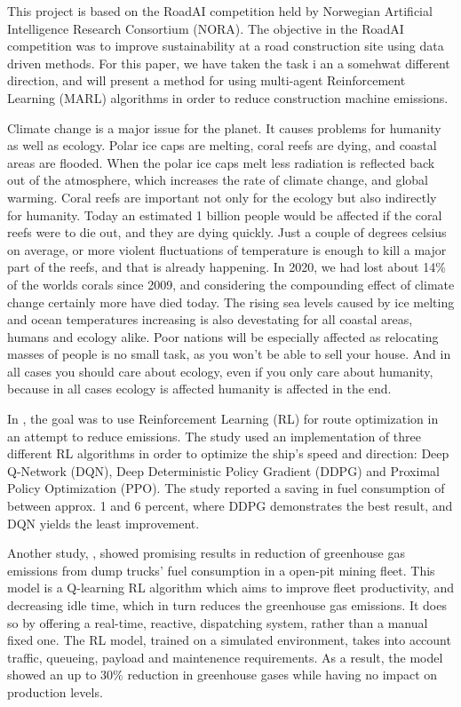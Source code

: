 \documentclass[conference]{IEEEtran}
\begin{document}
	This project is based on the RoadAI competition held by Norwegian Artificial Intelligence Research
	Consortium (NORA). \cite{noraRoadAIReducing} The objective in the RoadAI competition was to improve
	sustainability at a road construction site using data driven methods. For this paper, we have taken the
	task i an a somehwat different direction, and will present a method for using multi-agent Reinforcement
	Learning (MARL) algorithms in order to reduce construction machine emissions.

	Climate change is a major issue for the planet.
	It causes problems for humanity as well as ecology.
	Polar ice caps are melting, coral reefs are dying, and coastal areas are flooded.
	When the polar ice caps melt less radiation is reflected back out of the atmosphere, which increases the rate of climate change, and global warming.
	Coral reefs are important not only for the ecology but also indirectly for humanity.
	Today an estimated 1 billion people would be affected if the coral reefs were to die out\cite{coral_1billion}, and they are dying quickly.
	Just a couple of degrees celsius on average, or more violent fluctuations of temperature is enough to kill a major part of the reefs, and that is already happening.
	In 2020, we had lost about 14\% of the worlds corals since 2009\cite{Environment}, and considering the compounding effect of climate change certainly more have died today.
	The rising sea levels caused by ice melting and ocean temperatures increasing is also devestating for all coastal areas, humans and ecology alike.
	Poor nations will be especially affected as relocating masses of people is no small task, as you won't be able to sell your house.
	And in all cases you should care about ecology, even if you only care about humanity, because in all cases ecology is affected humanity is affected in the end.

	In \cite{MORADI2022111882}, the goal was to use Reinforcement Learning (RL) for route optimization in
	an attempt to reduce \coo{} emissions. The study used an implementation of three
	different RL algorithms in order to optimize the ship's speed and direction: Deep Q-Network (DQN),
	Deep Deterministic Policy Gradient (DDPG) and Proximal Policy Optimization (PPO). The study reported a
	saving in fuel consumption of between approx. 1 and 6 percent, where DDPG demonstrates the best result,
	and DQN yields the least improvement.

	Another study, \cite{HUO2023106664}, showed promising results in reduction of greenhouse gas
	emissions
	from dump trucks' fuel consumption in a open-pit mining fleet. This model is a Q-learning RL algorithm
	which aims to improve fleet productivity, and decreasing idle time, which in turn reduces the greenhouse
	gas emissions. It does so by offering a real-time, reactive,  dispatching system, rather than a manual
	fixed one. The RL model, trained on a simulated environment, takes into account traffic, queueing,
	payload and maintenence requirements. As a result, the model showed an up to 30\% reduction in greenhouse
	gases while having no impact on production levels.
\end{document}
